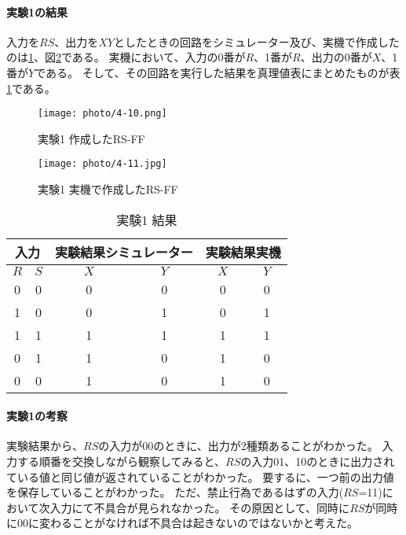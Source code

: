 \documentclass[dvipdfmx]{jsarticle}
\begin{document}
\paragraph{実験1の結果}

入力を$RS$、出力を$XY$としたときの回路をシミュレーター及び、実機で作成したのは\ref{fig:4-10}、図\ref{fig:4-11}である。
実機において、入力の0番が$R$、1番が$R$、出力の0番が$X$、1番が$Y$である。
そして、その回路を実行した結果を真理値表にまとめたものが表\ref{tb:4-6}である。

\begin{figure}[hbtp]
  \begin{center}
    \texttt{[image: photo/4-10.png]}
  \end{center}
  \caption{実験1 作成したRS-FF}
  \label{fig:4-10}
\end{figure}

\begin{figure}[hbtp]
  \begin{center}
    \texttt{[image: photo/4-11.jpg]}
  \end{center}
  \caption{実験1 実機で作成したRS-FF}
  \label{fig:4-11}
\end{figure}

\begin{table}[hbtp]
  \caption{実験1 結果}
  \centering
  \begin{tabular}{|c|c||c|c||c|c|} \hline
    \multicolumn{2}{|c||}{入力} & \multicolumn{2}{c||}{実験結果シミュレーター} & \multicolumn{2}{c|}{実験結果実機} \\ \hline
    $R$ & $S$ & $X$ & $Y$ & $X$ & $Y$ \\ \hline
    0 & 0 & 0 & 0 & 0 & 0 \\ \hline
    1 & 0 & 0 & 1 & 0 & 1 \\ \hline
    1 & 1 & 1 & 1 & 1 & 1 \\ \hline
    0 & 1 & 1 & 0 & 1 & 0 \\ \hline
    0 & 0 & 1 & 0 & 1 & 0 \\ \hline
  \end{tabular}
  \label{tb:4-6}
\end{table}

\paragraph{実験1の考察}

実験結果から、$RS$の入力が00のときに、出力が2種類あることがわかった。
入力する順番を交換しながら観察してみると、$RS$の入力01、10のときに出力されている値と同じ値が返されていることがわかった。
要するに、一つ前の出力値を保存していることがわかった。
ただ、禁止行為であるはずの入力($RS$=11)において次入力にて不具合が見られなかった。
その原因として、同時に$RS$が同時に00に変わることがなければ不具合は起きないのではないかと考えた。
\end{document}
